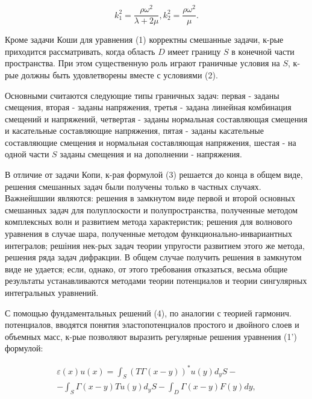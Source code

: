 \documentclass[10pt]{article}
\begin{document}
\[

k_{1}^{2}=\frac{\rho \omega^{2}}{\lambda+2 \mu}, k_{2}^{2}=\frac{\rho \omega^{2}}{\mu} .

\]



Кроме задачи Коши для уравнения (1) корректны смешанные задачи, к-рые приходится рассматривать, когда область $D$ имеет границу $S$ в конечной части пространства. При этом существенную роль играют граничные условия на $S$, к-рые должны быть удовлетворены вместе с условиями (2).



Основными считаются следующие типы граничных задач: первая - заданы смещения, вторая - заданы напряжения, третья - задана линейная комбинация смещений и напряжений, четвертая - заданы нормальная составляющая смещения и касательные составляющие напряжения, пятая - заданы касательные составляющие смещения и нормальная составляющая напряжения, шестая - на одной части $S$ заданы смещения и на дополнении - напряжения.



В отличие от задачи Копи, к-рая формулой (3) решается до конца в общем виде, решения смешанных задач были получены только в частных случаях. Важнейшшии являются: решения в замкнутом виде первой и второй основных смешанных задач для полуплоскости и полупространства, полученные методом комплексных волн и развитием метода характеристик; решения для волнового уравнения в случае шара, полученные методом функционально-инвариантных интегралов; решіния нек-рых задач теории упругости развитием этого же метода, решения ряда задач дифракции. В общем случае получить решения в замкнутом виде не удается; если, однако, от этого требования отказаться, весьма общие результаты устанавливаются методами теории потенциалов и теории сингулярных интегральных уравнений.



С помощью фундаментальных решений (4), по аналогии с теорией гармонич. потенциалов, вводятся понятия эластопотенциалов простого и двойного слоев и объемных масс, к-рые позволяют выразить регулярные решения уравнения (1') формулой:



\[

\begin{gathered}

\varepsilon(x) u(x)=\int_{S}(T \Gamma(x-y))^{*} u(y) d_{y} S- \\

-\int_{S} \Gamma(x-y) T u(y) d_{y} S-\int_{D} \Gamma(x-y) F(y) d y,

\end{gathered}

\]
\end{document}
